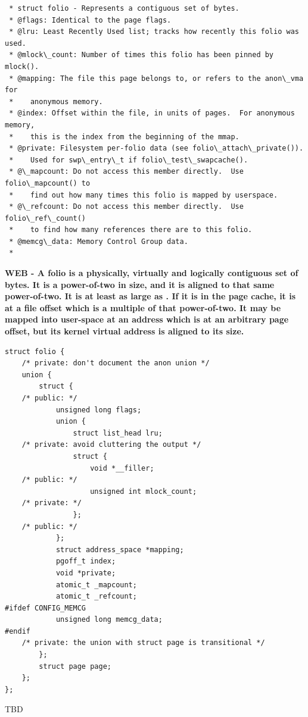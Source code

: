 \begin{lstlisting}
 * struct folio - Represents a contiguous set of bytes.
 * @flags: Identical to the page flags.
 * @lru: Least Recently Used list; tracks how recently this folio was used.
 * @mlock\_count: Number of times this folio has been pinned by mlock().
 * @mapping: The file this page belongs to, or refers to the anon\_vma for
 *    anonymous memory.
 * @index: Offset within the file, in units of pages.  For anonymous memory,
 *    this is the index from the beginning of the mmap.
 * @private: Filesystem per-folio data (see folio\_attach\_private()).
 *    Used for swp\_entry\_t if folio\_test\_swapcache().
 * @\_mapcount: Do not access this member directly.  Use folio\_mapcount() to
 *    find out how many times this folio is mapped by userspace.
 * @\_refcount: Do not access this member directly.  Use folio\_ref\_count()
 *    to find how many references there are to this folio.
 * @memcg\_data: Memory Control Group data.
 *
 \end{lstlisting}
 
\textbf{WEB - A folio is a physically, virtually and logically contiguous set of bytes.  It is a power-of-two in size, and it is aligned to that same power-of-two.  It is at least as large as .  If it is in the page cache, it is at a file offset which is a multiple of that power-of-two.  It may be mapped into user-space at an address which is at an arbitrary page offset, but its kernel virtual address is aligned to its size.}


\begin{lstlisting}
struct folio {
    /* private: don't document the anon union */
    union {
        struct {
    /* public: */
            unsigned long flags;
            union {
                struct list_head lru;
    /* private: avoid cluttering the output */
                struct {
                    void *__filler;
    /* public: */
                    unsigned int mlock_count;
    /* private: */
                };
    /* public: */
            };
            struct address_space *mapping;
            pgoff_t index;
            void *private;
            atomic_t _mapcount;
            atomic_t _refcount;
#ifdef CONFIG_MEMCG
            unsigned long memcg_data;
#endif
    /* private: the union with struct page is transitional */
        };
        struct page page;
    };
};
\end{lstlisting}

\noindent
TBD


